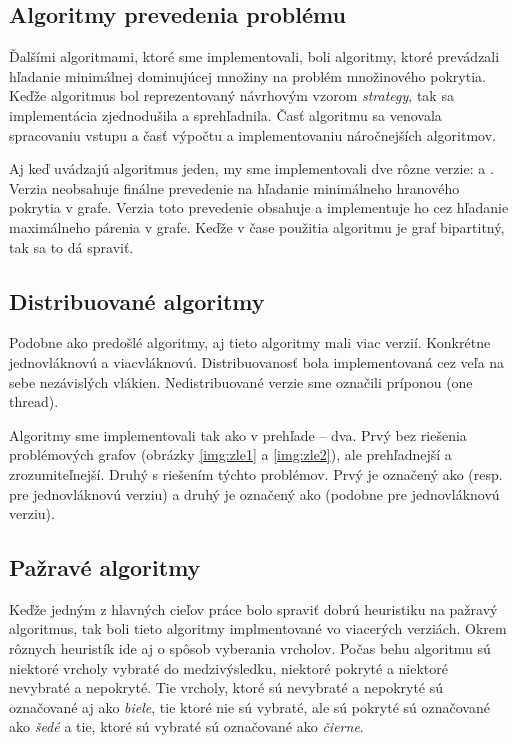 \subsection{Algoritmy prevedenia problému}

Ďalšími algoritmami, ktoré sme implementovali, boli algoritmy, ktoré prevádzali 
hľadanie minimálnej dominujúcej množiny na problém množinového pokrytia. Keďže 
algoritmus bol reprezentovaný návrhovým vzorom \emph{strategy}, tak 
sa implementácia zjednodušila a sprehľadnila. Časť algoritmu sa venovala 
spracovaniu vstupu a časť výpočtu a implementovaniu náročnejších algoritmov. 

Aj keď \citet{fomin05} uvádzajú algoritmus jeden, my sme implementovali dve rôzne 
verzie:  a . Verzia  neobsahuje finálne 
prevedenie na hľadanie minimálneho hranového pokrytia v grafe. Verzia 
 toto prevedenie obsahuje a implementuje ho cez hľadanie 
maximálneho párenia v grafe. Keďže v čase použitia algoritmu je graf 
bipartitný, tak sa to dá spraviť.

\subsection{Distribuované algoritmy}

Podobne ako predošlé algoritmy, aj tieto algoritmy mali viac verzií. Konkrétne 
jednovláknovú a viacvláknovú. Distribuovanosť bola implementovaná cez veľa 
na sebe nezávislých vlákien. Nedistribuované verzie sme označili príponou 
 (one thread).

Algoritmy sme implementovali tak ako v prehľade -- dva. Prvý bez riešenia 
problémových grafov (obrázky \ref{img:zle1} a \ref{img:zle2}), ale prehľadnejší 
a zrozumiteľnejší. Druhý s riešením týchto problémov. Prvý je označený ako 
 (resp.~ pre jednovláknovú verziu) a druhý je 
označený ako  (podobne  pre jednovláknovú verziu).

\subsection{Pažravé algoritmy}

Keďže jedným z hlavných cieľov práce bolo spraviť dobrú heuristiku na pažravý 
algoritmus, tak boli tieto algoritmy implmentované vo viacerých verziách. Okrem 
rôznych heuristík ide aj o spôsob vyberania vrcholov. Počas behu algoritmu sú 
niektoré vrcholy vybraté do medzivýsledku, niektoré pokryté a niektoré 
nevybraté a nepokryté. Tie vrcholy, ktoré sú nevybraté a nepokryté sú 
označované aj ako \emph{biele}, tie ktoré nie sú vybraté, ale sú pokryté sú 
označované ako \emph{šedé} a tie, ktoré sú vybraté sú označované ako 
\emph{čierne}.